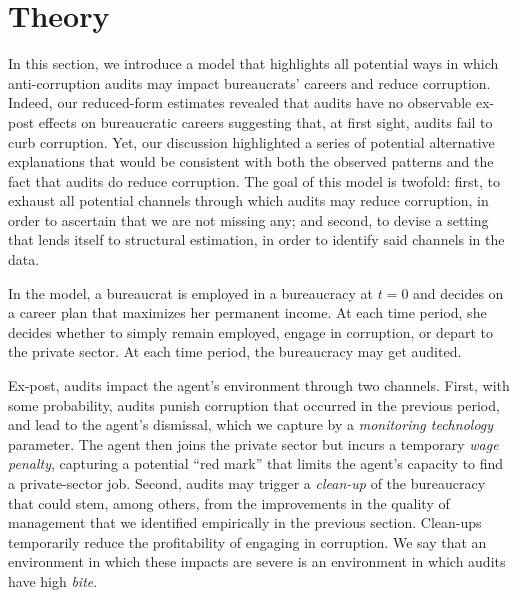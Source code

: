 \documentclass[12pt,a4paper]{article}
\theoremstyle{definition}
\begin{document}
\section{Theory}
\label{sec:theory}

In this section, we introduce a model that highlights all potential ways in which anti-corruption audits may impact bureaucrats' careers and reduce corruption. Indeed, our reduced-form estimates revealed that audits have no observable ex-post effects on bureaucratic careers suggesting that, at first sight, audits fail to curb corruption. Yet, our discussion highlighted a series of potential alternative explanations that would be consistent with both the observed patterns and the fact that audits do reduce corruption. The goal of this model is twofold: first, to exhaust all potential channels through which audits may reduce corruption, in order to ascertain that we are not missing any; and second, to devise a setting that lends itself to structural estimation, in order to identify said channels in the data. 

In the model, a bureaucrat is employed in a bureaucracy at $t = 0$ and decides on a career plan that maximizes her permanent income. At each time period, she decides whether to simply remain employed, engage in corruption, or depart to the private sector. At each time period, the bureaucracy may get audited. 

Ex-post, audits impact the agent's environment through two channels. First, with some probability, audits punish corruption that occurred in the previous period, and lead to the agent's dismissal, which we capture by a \emph{monitoring technology} parameter. The agent then joins the private sector but incurs a temporary \emph{wage penalty}, capturing a potential ``red mark'' that limits the agent's capacity to find a private-sector job. Second, audits may trigger a \emph{clean-up} of the bureaucracy that could stem, among others, from the improvements in the quality of management that we identified empirically in the previous section. Clean-ups temporarily reduce the profitability of engaging in corruption. We say that an environment in which these impacts are severe is an environment in which audits have high \emph{bite}. 
\end{document}
